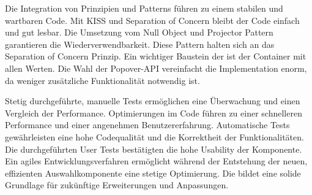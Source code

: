 Die Integration von Prinzipien und Patterns führen zu einem stabilen und wartbaren Code. 
Mit KISS und Separation of Concern bleibt der Code einfach und gut lesbar. 
Die Umsetzung vom Null Object und Projector Pattern garantieren die Wiederverwendbarkeit. 
Diese Pattern halten sich an das Separation of Concern Prinzip. 
Ein wichtiger Baustein der  ist der Container mit allen Werten. 
Die Wahl der Popover-API vereinfacht die Implementation enorm, da weniger zusätzliche Funktionalität notwendig ist. 

Stetig durchgeführte, manuelle Tests ermöglichen eine Überwachung und einen Vergleich der Performance. 
Optimierungen im Code führen zu einer schnelleren Performance und einer angenehmen Benutzererfahrung. 
Automatische Tests gewährleisten eine hohe Codequalität und die Korrektheit der Funktionalitäten. 
Die durchgeführten User Tests bestätigten die hohe Usability der Komponente. 
Ein agiles Entwicklungsverfahren ermöglicht während der Entstehung der neuen, effizienten Auswahlkomponente eine stetige Optimierung. 
Die  bildet eine solide Grundlage für zukünftige Erweiterungen und Anpassungen. 
